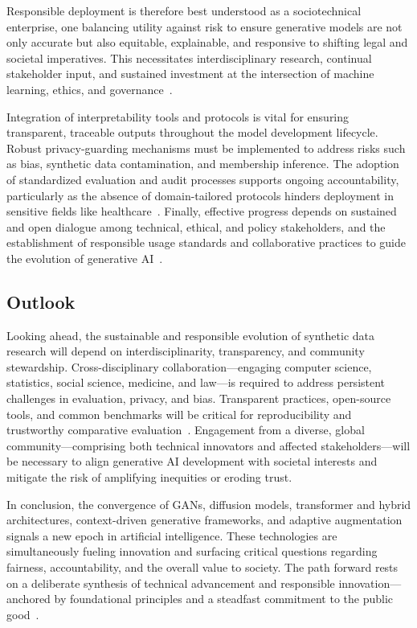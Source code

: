 \documentclass[sigconf]{acmart}
\begin{document}
Responsible deployment is therefore best understood as a sociotechnical enterprise, one balancing utility against risk to ensure generative models are not only accurate but also equitable, explainable, and responsive to shifting legal and societal imperatives. This necessitates interdisciplinary research, continual stakeholder input, and sustained investment at the intersection of machine learning, ethics, and governance~\cite{ref87,ref88,ref89,ref90}.

Integration of interpretability tools and protocols is vital for ensuring transparent, traceable outputs throughout the model development lifecycle. Robust privacy-guarding mechanisms must be implemented to address risks such as bias, synthetic data contamination, and membership inference. The adoption of standardized evaluation and audit processes supports ongoing accountability, particularly as the absence of domain-tailored protocols hinders deployment in sensitive fields like healthcare~\cite{ref89,ref91}. Finally, effective progress depends on sustained and open dialogue among technical, ethical, and policy stakeholders, and the establishment of responsible usage standards and collaborative practices to guide the evolution of generative AI~\cite{ref87,ref88,ref89}.

\subsection{Outlook}

Looking ahead, the sustainable and responsible evolution of synthetic data research will depend on interdisciplinarity, transparency, and community stewardship. Cross-disciplinary collaboration---engaging computer science, statistics, social science, medicine, and law---is required to address persistent challenges in evaluation, privacy, and bias. Transparent practices, open-source tools, and common benchmarks will be critical for reproducibility and trustworthy comparative evaluation~\cite{ref74,ref75,ref97,ref102}. Engagement from a diverse, global community---comprising both technical innovators and affected stakeholders---will be necessary to align generative AI development with societal interests and mitigate the risk of amplifying inequities or eroding trust.

In conclusion, the convergence of GANs, diffusion models, transformer and hybrid architectures, context-driven generative frameworks, and adaptive augmentation signals a new epoch in artificial intelligence. These technologies are simultaneously fueling innovation and surfacing critical questions regarding fairness, accountability, and the overall value to society. The path forward rests on a deliberate synthesis of technical advancement and responsible innovation---anchored by foundational principles and a steadfast commitment to the public good~\cite{ref74,ref75,ref81,ref82,ref90,ref91,ref92,ref93,ref94,ref95,ref96,ref97,ref98,ref99,ref100,ref101,ref102}.



\end{document}
